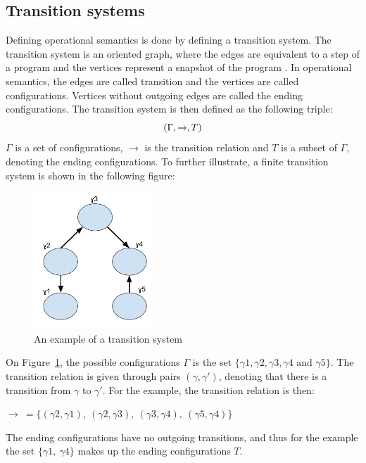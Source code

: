 \subsection{Transition systems}
Defining operational semantics is done by defining a transition system. The transition system is an oriented graph, where the edges are equivalent to a step of a program and the vertices represent a snapshot of the program \cite{PilenVedTraeetsRod}. In operational semantics, the edges are called transition and the vertices are called configurations. Vertices without outgoing edges are called the ending configurations. The transition system is then defined as the following triple:
\\
\begin{equation*}
\centering
    (\Gamma, \xrightarrow{}, T)
\end{equation*}
$\Gamma$ is a set of configurations, $\xrightarrow{}$ is the transition relation and $T$ is a subset of $\Gamma$, denoting the ending configurations.
To further illustrate, a finite transition system is shown in the following figure:
\begin{figure}[H]
\centering
  \includegraphics[width=0.4\textwidth]{figures/semantics/TransistionssystemsFigur.png}
  \caption{An example of a transition system}
  \label{fig:TransistionSystem}
\end{figure}
\noindent
On Figure~\ref{fig:TransistionSystem}, the possible configurations $\Gamma$ is the set $\{\gamma1, \gamma2, \gamma3, \gamma4 \text{ and } \gamma5\}$. The transition relation is given through pairs $(\gamma, \gamma')$, denoting that there is a transition from $\gamma$ to $\gamma'$. For the example, the transition relation is then: 
\begin{center}
$\xrightarrow{} \: = \{(\gamma2, \gamma1),\: (\gamma2, \gamma3), \:(\gamma3, \gamma4), \:(\gamma5, \gamma4)\}$
\end{center}
The ending configurations have no outgoing transitions, and thus for the example the set $\{\gamma1, \: \gamma4\}$ makes up the ending configurations $T$.

